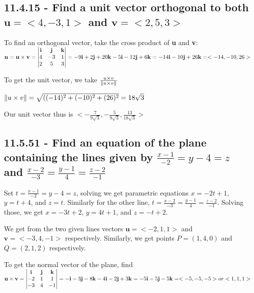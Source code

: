 \documentclass{article}
\begin{document}
\subsection{11.4.15 - Find a unit vector orthogonal to both $\textbf{u} = <4, -3, 1>$ and $\textbf{v} = <2, 5, 3>$}
\par\noindent\large To find an orthogonal vector, take the cross product of \textbf{u} and \textbf{v}:\vspace{0.25cm}
$\textbf{n} = \textbf{u} \times \textbf{v} = \begin{vmatrix}
\textbf{i} & \textbf{j} & \textbf{k} \\ 
4 & -3 & 1 \\ 
2 & 5 & 3  \notag
\end{vmatrix} = \linebreak -9\textbf{i} + 2\textbf{j} + 20\textbf{k} - 5\textbf{i} - 12\textbf{j} + 6\textbf{k}= -14\textbf{i} - 10\textbf{j} + 26\textbf{k} = <-14, -10, 26>$
\par\noindent\Large To get the unit vector, we take $\frac{u \times v}{\norm{u \times v}}$
\par\noindent\large $\norm{u \times v} = \sqrt{((-14)^{2} + (-10)^{2} + (26)^{2}} = 18\sqrt{3}$
\par\noindent\Large Our unit vector thus is $<-\frac{7}{9\sqrt{3}}, -\frac{5}{9\sqrt{3}}, \frac{13}{18\sqrt{3}}>$

\subsection{11.5.51 - Find an equation of the plane containing the lines given by $\frac{x - 1}{-2} = y - 4 = z$ and $\frac{x - 2}{-3} = \frac{y - 1}{4} = \frac{z - 2}{-1}$}
\par\noindent\Large Set $t = \frac{x - 1}{-2} = y - 4 = z$, solving we get parametric equations $x = -2t + 1$, $y = t + 4$, and $z = t$.  Similarly for the other line, $t = \frac{x - 2}{-3} = \frac{y - 1}{4} = \frac{z - 2}{-1}$.  Solving those, we get $x = -3t + 2$, $y = 4t + 1$, and $z = -t + 2$.\vspace{0.25cm}

\par\noindent\large We get from the two given lines vectors $\textbf{u} = <-2, 1, 1>$ and $\textbf{v} = <-3, 4, -1>$ respectively.  Similarly, we get points $P = (1, 4, 0)$ and $Q = (2, 1, 2)$ respectively.\vspace{0.25cm}

\par\noindent\large To get the normal vector of the plane, find $\textbf{u} \times \textbf{v} = \begin{vmatrix}
\textbf{i} & \textbf{j} & \textbf{k} \\ 
-2 & 1 & 1 \\ 
-3 & 4 & -1  \notag
\end{vmatrix} = -\textbf{i} - 3\textbf{j} - 8\textbf{k} - 4\textbf{i} - 2\textbf{j} + 3\textbf{k} = \linebreak -5\textbf{i} - 5\textbf{j} - 5\textbf{k} = <-5, -5, -5> or <1, 1, 1>$\vspace{0.25cm}
\end{document}
